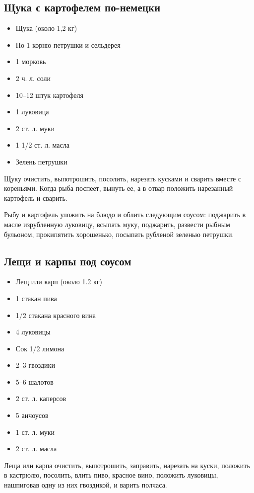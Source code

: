 \subsection{Щука с картофелем по-немецки}

\begin{itemize}
	\item Щука (около 1,2 кг) 
    \item По 1 корню петрушки и сельдерея
    \item 1 морковь 
    \item 2 ч. л. соли
    \item 10–12 штук картофеля 
    \item 1 луковица 
    \item 2 ст. л. муки
    \item 1 1/2 ст. л. масла
    \item Зелень петрушки
\end{itemize}

Щуку очистить, выпотрошить, посолить, нарезать кусками и сварить вместе с кореньями. Когда рыба поспеет, вынуть ее, а в отвар положить нарезанный картофель и сварить.

Рыбу и картофель уложить на блюдо и облить следующим соусом: поджарить в масле изрубленную луковицу, всыпать муку, поджарить, развести рыбным бульоном, прокипятить хорошенько, посыпать рубленой зеленью петрушки.

\subsection{Лещи и карпы под соусом}

\begin{itemize}
	\item Лещ или карп (около 1.2 кг) 
    \item 1 стакан пива
    \item 1/2 стакана красного вина 
    \item 4 луковицы
    \item Сок 1/2 лимона
    \item 2–3 гвоздики
    \item 5–6 шалотов 
    \item 2 ст. л. каперсов
    \item 5 анчоусов
    \item 1 ст. л. муки
    \item 2 ст. л. масла
\end{itemize}

Леща или карпа очистить, выпотрошить, заправить, нарезать на куски, положить в кастрюлю, посолить, влить пиво, красное вино, положить луковицы, нашпиговав одну из них гвоздикой, и варить полчаса.

